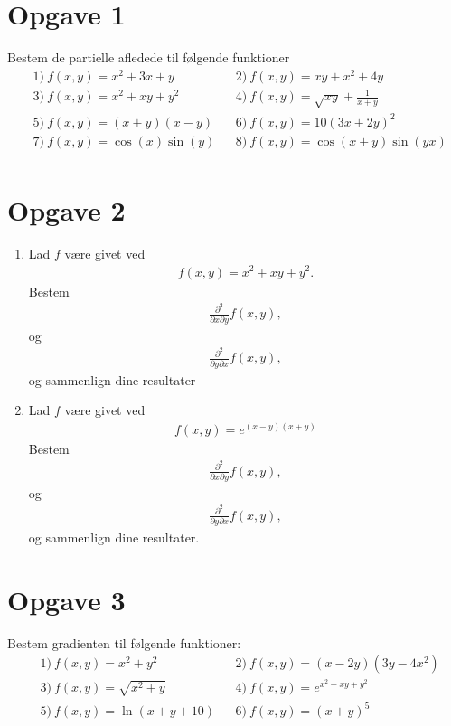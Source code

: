 \section*{Opgave 1}

Bestem de partielle afledede til følgende funktioner
\begin{align*}
	&1)  \ f(x,y) = x^2+3x+y   &&2) \  f(x,y) = xy+x^2+4y   \\
	&3)  \ f(x,y) = x^2 + xy + y^2   &&4) \  f(x,y) = \sqrt{xy}+\frac{1}{x+y}   \\
	&5)  \ f(x,y) = (x+y)(x-y)   &&6) \  f(x,y) = 10(3x+2y)^2   \\
	&7)  \ f(x,y) = \cos(x)\sin(y)   &&8) \  f(x,y) = \cos(x+y)\sin(yx)  \\
\end{align*}

\section*{Opgave 2}
\begin{enumerate}[label=\roman*)]
	\item Lad $f$ være givet ved
	\begin{align*}
		f(x,y) = x^2+xy+y^2.
	\end{align*}
	Bestem
	\begin{align*}
		\frac{\partial^2}{\partial x \partial y}f(x,y),
	\end{align*}
	og
	\begin{align*}
		\frac{\partial^2}{\partial y \partial x}f(x,y),
	\end{align*}
	og sammenlign dine resultater
	\item Lad $f$ være givet ved
	\begin{align*}
		f(x,y) = e^{(x-y)(x+y)}
	\end{align*}
	Bestem
	\begin{align*}
		\frac{\partial^2}{\partial x \partial y}f(x,y),
	\end{align*}
	og
	\begin{align*}
		\frac{\partial^2}{\partial y \partial x}f(x,y),
	\end{align*}
	og sammenlign dine resultater.
\end{enumerate}

\section*{Opgave 3}
Bestem gradienten til følgende funktioner:
\begin{align*}
	&1)  \ f(x,y) = x^2+y^2   &&2) \  f(x,y) = (x-2y)(3y-4x^2)   \\
	&3)  \ f(x,y) = \sqrt{x^2+y}   &&4) \  f(x,y) = e^{x^2+xy+y^2}   \\
	&5)  \ f(x,y) = \ln(x+y+10)   &&6) \  f(x,y) = (x+y)^5  
\end{align*}

